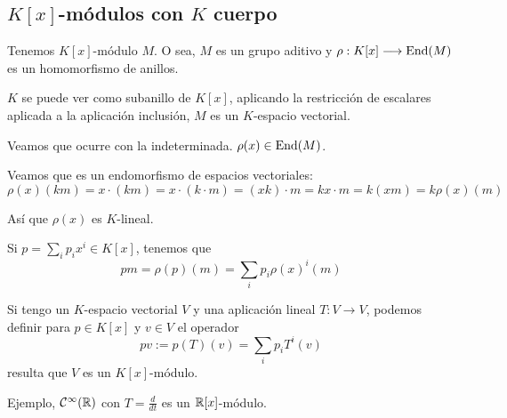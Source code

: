 \subsection{\(K[x]\)-módulos con \(K\) cuerpo}

Tenemos \(K[x]\)-módulo \(M\). O sea, \(M\) es un grupo aditivo
y \(\rho: K[x]\longrightarrow\operatorname{End}(M)\) es un homomorfismo de anillos.

\(K\) se puede ver como subanillo de \(K[x]\), aplicando la
restricción de escalares aplicada a la aplicación inclusión,
\(M\) es un \(K\)-espacio vectorial.

Veamos que ocurre con la indeterminada. \(\rho(x)\in\operatorname{End}(M)\).

Veamos que es un endomorfismo de espacios vectoriales:
\[
  \rho(x)(km)=x\cdot (km)=x\cdot(k\cdot m)=(xk)\cdot m
  =kx\cdot m=k(xm)=k\rho(x)(m)
\]

Así que \(\rho(x)\) es \(K\)-lineal.

Si \(p=\sum_i p_i x^i\in K[x]\), tenemos que
\[
  pm=\rho(p)(m)=\sum_i p_i {\rho(x)}^i(m)
\]

\begin{prop}
  Si tengo un \(K\)-espacio vectorial \(V\) y una aplicación
  lineal \(T:V\longrightarrow V\), podemos definir para \(p\in K[x]\)
  y \(v\in V\) el operador
  \[
    pv:=p(T)(v)=\sum_i p_i T^i(v)
  \]
  resulta que \(V\) es un \(K[x]\)-módulo.
\end{prop}

Ejemplo, \(\mathcal{C}^\infty(\mathbb{R})\) con \(T=\frac{d}{dt}\)
es un \(\mathbb{R}[x]\)-módulo.
